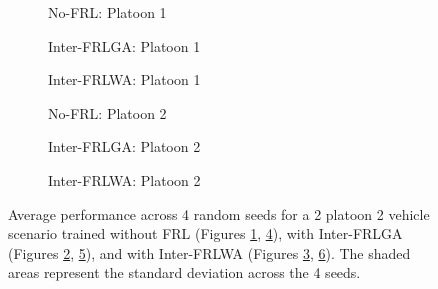 \begin{figure}[H]
\centering
    \begin{subfigure}{\interfrlRewWidth\textwidth}
        \raggedleft
        
       \caption{No-FRL: Platoon 1}\label{fig:avgep_pl1reward_nofrl}
    \end{subfigure}\hspace{\interfrlRewSpace}
    \begin{subfigure}{\interfrlRewWidth\textwidth}
        \raggedleft
        
       \caption{Inter-FRLGA: Platoon 1}\label{fig:avgep_pl1reward_grads}
    \end{subfigure}\hspace{\interfrlRewSpace}
    \begin{subfigure}{\interfrlRewWidth\textwidth}
        \raggedleft
        
       \caption{Inter-FRLWA: Platoon 1}\label{fig:avgep_pl1reward_weight}
    \end{subfigure}
    \begin{subfigure}{\interfrlRewWidth\textwidth}
        \raggedleft
        
       \caption{No-FRL: Platoon 2}\label{fig:avgep_pl2reward_nofrl}
    \end{subfigure}\hspace{\interfrlRewSpace}
    \begin{subfigure}{\interfrlRewWidth\textwidth}
        \raggedleft
        
       \caption{Inter-FRLGA: Platoon 2}\label{fig:avgep_pl2reward_grads}
    \end{subfigure}\hspace{\interfrlRewSpace}
    \begin{subfigure}{\interfrlRewWidth\textwidth}
        \raggedleft
        
       \caption{Inter-FRLWA: Platoon 2}\label{fig:avgep_pl2reward_weight}
    \end{subfigure}
\caption{Average performance across 4 random seeds for a 2 platoon 2 vehicle scenario 
trained without FRL (Figures \ref{fig:avgep_pl1reward_nofrl}, \ref{fig:avgep_pl2reward_nofrl}), 
with Inter-FRLGA (Figures \ref{fig:avgep_pl1reward_grads}, \ref{fig:avgep_pl2reward_grads}), 
and with Inter-FRLWA (Figures \ref{fig:avgep_pl1reward_weight}, \ref{fig:avgep_pl2reward_weight}). 
The shaded areas represent the standard deviation across the 4 seeds.}
\label{fig:inter_avep_rew}
\end{figure}


